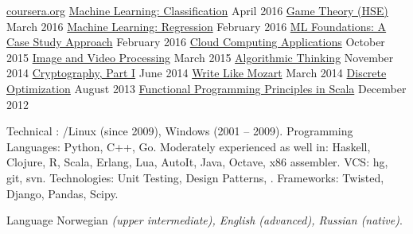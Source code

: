 \documentclass[unicode, 10pt, a4paper, oneside, fleqn]{article}
\begin{document}
\begin{minipage}[t]{0.50\textwidth}
\setlength\abovedisplayskip{0pt}
\courseplatform
    {\href{http://www.coursera.org}{coursera.org}}
    {}
    {
        \course
            {\href{}
                  {Machine Learning: Classification}}
            {April 2016}
            {}
        \course
            {\href{}
                  {Game Theory (HSE)}}
            {March 2016}
            {}
        \course
            {\href{}
                  {Machine Learning: Regression}}
            {February 2016}
            {}
        \course
            {\href{}
                  {ML Foundations: A Case Study Approach}}
            {February 2016}
            {}
        \course
            {\href{}
                  {Cloud Computing Applications}}
            {October 2015}
            {}
        \course
            {\href{https://drive.google.com/file/d/0B2cptPgckn74MGQ5SUVQRGVDNE0/view}
                  {Image and Video Processing}}
            {March 2015}
            {}
        \course
            {\href{https://drive.google.com/file/d/0B2cptPgckn74ZkIwTWNFYUx6STA/view?usp=sharing}
                  {Algorithmic Thinking}}
            {November 2014}
            {}
        \course
            {\href{https://drive.google.com/file/d/0B2cptPgckn74OWlrVEZlR3U3azQ/edit?usp=sharing}
                  {Cryptography, Part I}}
            {June 2014}
            {}
        \course
            {\href{https://drive.google.com/file/d/0B2cptPgckn74WHJkQkNTdnN4dVU/edit?usp=sharing}
                  {Write Like Mozart}}
            {March 2014}
            {}
        \course
            {\href{https://docs.google.com/file/d/0B2cptPgckn74ZnN0Znhnd3ZUejg/edit?usp=sharing}
                  {Discrete Optimization}}
            {August 2013}
            {}
        \course
            {\href{https://docs.google.com/document/d/1AWaukQ0K4C-ZcuRRqYANJuYDOPxYH7MoVdXYKHPYJ8I/edit}
                  {Functional Programming Principles in Scala}}
            {December 2012}
            {}
    }
\end{minipage}



\inlineheadsection  %
    {Technical}
    {
        : /Linux (since 2009), Windows (2001 -- 2009).
        Programming Languages: Python, C++, Go.
        Moderately experienced as well in: Haskell, Clojure, R, Scala,
        Erlang, Lua, AutoIt, Java, Octave, x86 assembler.
        VCS: hg, git, svn.
        Technologies: Unit Testing, Design Patterns, .
        Frameworks: Twisted, Django, Pandas, Scipy.
    }

\inlineheadsection
    {Language}
    {
        Norwegian \emph{(upper intermediate),  English \emph{(advanced)}, Russian \emph{(native)}}.
    }

%
%
\end{document}
